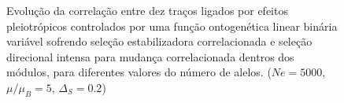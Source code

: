 \begin{center}
\begin{figure}[htbp]
  \centering
  \vspace{11pt}
  \vspace{-18pt}
  \vspace{11pt}
  \caption{Evolução da correlação entre dez traços ligados por efeitos
  pleiotrópicos controlados por uma função ontogenética linear binária
  variável sofrendo seleção estabilizadora correlacionada e seleção
  direcional intensa para mudança correlacionada dentros dos módulos,
  para diferentes valores do número de alelos. ($Ne=5000$, $\mu/\mu_B=5$, $\Delta_S=0.2$)}
  \label{MBLR}
\end{figure}
\end{center}
